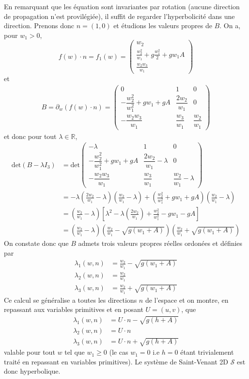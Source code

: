 \documentclass[
	french,
	11pt, %
]{fphw}
\newcommand{\myvec}[3]{\begin{pmatrix} #1  \\ #2 \\ #3 \end{pmatrix}}   %
\newcommand{\mymat}[9]{\begin{pmatrix} #1 & #2 & #3 \\ #4 & #5 & #6 \\ #7 & #8 &#9 \end{pmatrix}}  %
\begin{document}
En remarquant que les équation sont invariantes par rotation (aucune direction de propagation n'est provilégiée), il suffit de regarder l'hyperbolicité dans une direction. Prenons donc $n=(1,0)$ et étudions les valeurs propres de $B$. On a, pour $w_1 > 0$,
$$f(w)\cdot n = f_1(w) = \myvec{w_2}{\frac{w_2^2}{w_1} + g\frac{w_1^2}{2} + gw_1A}{\frac{w_2w_3}{w_1}}$$
et 
\begin{align*}
	B = \partial_w \left( f(w)\cdot n \right) = \mymat{0}{1}{0}{-\dfrac{w_2^2}{w_1^2}+gw_1+gA}{\dfrac{2w_2}{w_1}}{0}{-\dfrac{w_2w_3}{w_1}}{\dfrac{w_3}{w_1}}{\dfrac{w_2}{w_1}}
\end{align*}
et donc pour tout $\lambda \in \mathbb{R} $,
\begin{align*}
	\text{det}(B-\lambda I_3) &= \text{det} \mymat{-\lambda}{1}{0}{-\dfrac{w_2^2}{w_1^2}+gw_1+gA}{\dfrac{2w_2}{w_1}-\lambda}{0}{-\dfrac{w_2w_3}{w_1}}{\dfrac{w_3}{w_1}}{\dfrac{w_2}{w_1}-\lambda}  \\
	&= -\lambda \left( \frac{2w_2}{w_1} -\lambda \right)\left( \frac{w_2}{w_1} -\lambda \right) + \left( \frac{w_2^2}{w_1^2} +gw_1 +gA \right)\left( \frac{w_2}{w_1} -\lambda \right)     \\
	&= \left( \frac{w_2}{w_1} -\lambda \right) \left[ \lambda^2 - \lambda \left(\frac{2w_2}{w_1}\right) + \frac{w_2^2}{w_1^2}-gw_1-gA  \right] \\
	&= \left( \frac{w_2}{w_1} -\lambda \right) \left( \frac{w_2}{w_1} - \sqrt{g(w_1 + A)} \right) \left( \frac{w_2}{w_1} + \sqrt{g(w_1 + A)} \right)
\end{align*}
On constate donc que $B$ admets trois valeurs propres réelles ordonées et définies par 
\begin{align*}
	\lambda_1(w,n) &= \frac{w_2}{w_1} - \sqrt{g(w_1 + A)} \\
	\lambda_2(w,n) &= \frac{w_2}{w_1} \\
	\lambda_3(w,n) &= \frac{w_2}{w_1} + \sqrt{g(w_1 + A)}
\end{align*}
Ce calcul se généralise a toutes les directions $n$ de l'espace et on montre, en repassant aux variables primitives et en posant $U = (u,v)$, que 
\begin{align*}
	\lambda_1(w,n) &= U\cdot n - \sqrt{g(h + A)} \\
	\lambda_2(w,n) &= U\cdot n \\
	\lambda_3(w,n) &= U\cdot n + \sqrt{g(h + A)}
\end{align*}
valable pour tout $w$ tel que $w_1 \geq 0$ (le cas $w_1 = 0$ i.e $h=0$ étant trivialement traité en repassant en variables primitives). Le système de Saint-Venant 2D $\mathcal{S}$ est donc hyperbolique.
\end{document}
